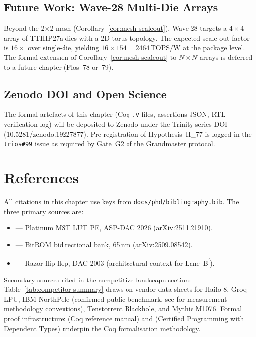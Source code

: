 \subsection{Future Work: Wave-28 Multi-Die Arrays}

Beyond the 2$\times$2 mesh (Corollary~\ref{cor:mesh-scaleout}), Wave-28 targets
a $4\times 4$ array of TTIHP27a dies with a 2D torus topology.
The expected scale-out factor is $16\times$ over single-die,
yielding $16 \times 154 = 2464\,\text{TOPS/W}$ at the package level.
The formal extension of Corollary~\ref{cor:mesh-scaleout} to $N \times N$ arrays
is deferred to a future chapter (Flos~78 or~79).

\subsection{Zenodo DOI and Open Science}

The formal artefacts of this chapter (Coq \texttt{.v} files, assertions JSON,
RTL verification log) will be deposited to Zenodo under the Trinity series
DOI~\cite{zenodo_trinity_anchor} (10.5281/zenodo.19227877).
Pre-registration of Hypothesis~H\_77 is logged in the \texttt{trios\#99} issue
as required by Gate~G2 of the Grandmaster protocol.

\section{References}
\label{sec:flos77-refs}

\noindent
All citations in this chapter use \BibTeX keys from
\texttt{docs/phd/bibliography.bib}.
The three primary sources are:
%
\begin{itemize}
  \item \cite{platinum_lut_pe_2026} --- Platinum MST LUT PE, ASP-DAC 2026
        (arXiv:2511.21910).
  \item \cite{bitrom_2025} --- BitROM bidirectional bank, 65\,nm
        (arXiv:2509.08542).
  \item \cite{ernst2003razor} --- Razor flip-flop, DAC 2003
        (architectural context for Lane~B\textsuperscript{$\prime$}).
\end{itemize}
%
Secondary sources cited in the competitive landscape section:
Table~\ref{tab:competitor-summary} draws on vendor data sheets for Hailo-8,
Groq LPU, IBM NorthPole (confirmed public benchmark, see \cite{pdg2022} for
measurement methodology conventions), Tenstorrent Blackhole, and Mythic M1076.
%
Formal proof infrastructure:
\cite{bertot_casteran} (Coq reference manual) and
\cite{chlipala_cpdt} (Certified Programming with Dependent Types) underpin
the Coq formalisation methodology.

